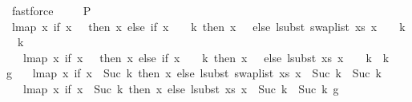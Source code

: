 \begin{isabellebody}
\ fastforce\isanewline
\isanewline
\isanewline
\ \ \ \isamarkupfalse%
\ P{}{\isacharcolon}{\kern0pt}\isanewline
\ {\isachardoublequoteopen}lmap\ {\isacharparenleft}{\kern0pt}{\isasymlambda}x{\isachardot}{\kern0pt}\ if\ x\ {\isacharequal}{\kern0pt}\ {}\ then\ x\ else\ {\isacharparenleft}{\kern0pt}if\ x\ {\isacharminus}{\kern0pt}\ {}\ {\isacharless}{\kern0pt}\ k\ then\ x\ {\isacharminus}{\kern0pt}\ {}\ else\ lsubst\ {\isacharparenleft}{\kern0pt}swap{\isacharunderscore}{\kern0pt}list\ xs{\isacharparenright}{\kern0pt}\ {\isacharparenleft}{\kern0pt}x\ {\isacharminus}{\kern0pt}\ {}\ {\isacharminus}{\kern0pt}\ k{\isacharparenright}{\kern0pt}\ {\isacharplus}{\kern0pt}\ k{\isacharparenright}{\kern0pt}\ {\isacharplus}{\kern0pt}\ {}{\isacharparenright}{\kern0pt}\isanewline
\ \ \ {\isacharparenleft}{\kern0pt}lmap\ {\isacharparenleft}{\kern0pt}{\isasymlambda}x{\isachardot}{\kern0pt}\ if\ x\ {\isacharequal}{\kern0pt}\ {}\ then\ x\ else\ {\isacharparenleft}{\kern0pt}if\ x\ {\isacharminus}{\kern0pt}\ {}\ {\isacharless}{\kern0pt}\ k\ then\ x\ {\isacharminus}{\kern0pt}\ {}\ else\ lsubst\ xs\ {\isacharparenleft}{\kern0pt}x\ {\isacharminus}{\kern0pt}\ {}\ {\isacharminus}{\kern0pt}\ k{\isacharparenright}{\kern0pt}\ {\isacharplus}{\kern0pt}\ k{\isacharparenright}{\kern0pt}\ {\isacharplus}{\kern0pt}\ {}{\isacharparenright}{\kern0pt}\ g{\isacharprime}{\kern0pt}{\isacharparenright}{\kern0pt}\ {\isacharequal}{\kern0pt}\isanewline
\ \ lmap\ {\isacharparenleft}{\kern0pt}{\isasymlambda}x{\isachardot}{\kern0pt}\ if\ x\ {\isacharless}{\kern0pt}\ Suc\ k\ then\ x\ else\ lsubst\ {\isacharparenleft}{\kern0pt}swap{\isacharunderscore}{\kern0pt}list\ xs{\isacharparenright}{\kern0pt}\ {\isacharparenleft}{\kern0pt}x\ {\isacharminus}{\kern0pt}\ {\isacharparenleft}{\kern0pt}Suc\ k{\isacharparenright}{\kern0pt}{\isacharparenright}{\kern0pt}\ {\isacharplus}{\kern0pt}\ {\isacharparenleft}{\kern0pt}Suc\ k{\isacharparenright}{\kern0pt}{\isacharparenright}{\kern0pt}\isanewline
\ \ \ {\isacharparenleft}{\kern0pt}lmap\ {\isacharparenleft}{\kern0pt}{\isasymlambda}x{\isachardot}{\kern0pt}\ if\ x\ {\isacharless}{\kern0pt}\ Suc\ k\ then\ x\ else\ lsubst\ xs\ {\isacharparenleft}{\kern0pt}x\ {\isacharminus}{\kern0pt}\ {\isacharparenleft}{\kern0pt}Suc\ k{\isacharparenright}{\kern0pt}{\isacharparenright}{\kern0pt}\ {\isacharplus}{\kern0pt}\ {\isacharparenleft}{\kern0pt}Suc\ k{\isacharparenright}{\kern0pt}{\isacharparenright}{\kern0pt}\ g{\isacharprime}{\kern0pt}{\isacharparenright}{\kern0pt}{\isachardoublequoteclose}\isanewline

\end{isabellebody}
